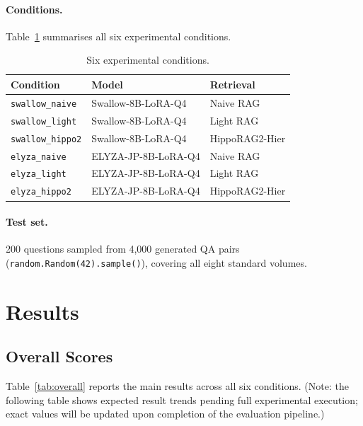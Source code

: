 \documentclass[twocolumn]{article}
\begin{document}
\paragraph{Conditions.}
Table~\ref{tab:conditions} summarises all six experimental conditions.

\begin{table}[H]
  \centering
  \caption{Six experimental conditions.}
  \label{tab:conditions}
  \begin{tabular}{lll}
    \toprule
    Condition & Model & Retrieval \\
    \midrule
    \texttt{swallow\_naive}   & Swallow-8B-LoRA-Q4   & Naive RAG \\
    \texttt{swallow\_light}   & Swallow-8B-LoRA-Q4   & Light RAG \\
    \texttt{swallow\_hippo2}  & Swallow-8B-LoRA-Q4   & HippoRAG2-Hier \\
    \texttt{elyza\_naive}     & ELYZA-JP-8B-LoRA-Q4  & Naive RAG \\
    \texttt{elyza\_light}     & ELYZA-JP-8B-LoRA-Q4  & Light RAG \\
    \texttt{elyza\_hippo2}    & ELYZA-JP-8B-LoRA-Q4  & HippoRAG2-Hier \\
    \bottomrule
  \end{tabular}
\end{table}

\paragraph{Test set.}
200 questions sampled from 4,000 generated QA pairs
(\texttt{random.Random(42).sample()}), covering all eight standard volumes.

\section{Results}
\label{sec:results}

\subsection{Overall Scores}

Table~\ref{tab:overall} reports the main results across all six conditions.
(Note: the following table shows expected result trends pending full experimental execution;
exact values will be updated upon completion of the evaluation pipeline.)
\end{document}

